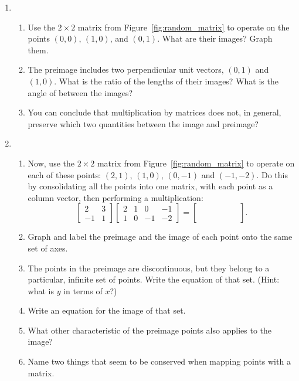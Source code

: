 \documentclass[../gatm.tex]{subfiles}
\begin{document}
\begin{enumerate}
\item \begin{enumerate}
\item Use the $2\times 2$ matrix from Figure~\ref{fig:random_matrix} to operate on the points $(0,0)$, $(1,0)$, and $(0,1)$. What are their images? Graph them.
\item The preimage includes two perpendicular unit vectors, $(0,1)$ and $(1,0)$. What is the ratio of the lengths of their images? What is the angle of between the images?
\item You can conclude that multiplication by matrices does not, in general, preserve which two quantities between the image and preimage?
\end{enumerate}
\item \begin{enumerate}
\item Now, use the $2\times 2$ matrix from Figure~\ref{fig:random_matrix} to operate on each of these points: $(2,1)$, $(1,0)$, $(0,-1)$ and $(-1,-2)$. Do this by consolidating all the points into one matrix, with each point as a column vector, then performing a multiplication:
$$\left[\begin{array}{cc}2 & 3 \\ -1 & 1 \end{array}\right]
\left[\begin{array}{cccc}2 & 1 & 0 & -1 \\ 1 & 0 & -1 & -2\end{array}\right]
=\left[\begin{array}{cccc}\phantom{0} & \phantom{0} & \phantom{0} & \phantom{0} \\ \phantom{0}\end{array}\right].$$
\item Graph and label the preimage and the image of each point onto the same set of axes.
\item The points in the preimage are discontinuous, but they belong to a particular, infinite set of points. Write the equation of that set. (Hint: what is $y$ in terms of $x$?)
\item Write an equation for the image of that set.
\item What other characteristic of the preimage points also applies to the image?
\item Name two things that seem to be conserved when mapping points with a matrix.
\end{enumerate}
\setcounter{mp_problem_i}{\value{enumi}}
\end{enumerate}
\end{document}
